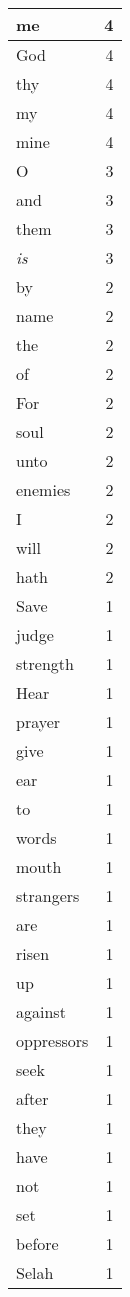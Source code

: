 \begin{center}
\begin{longtable}{l|r}
\hline \hline
\endlastfoot
me & 4 \\ \hline
God & 4 \\ \hline
thy & 4 \\ \hline
my & 4 \\ \hline
mine & 4 \\ \hline
O & 3 \\ \hline
and & 3 \\ \hline
them & 3 \\ \hline
\emph{is} & 3 \\ \hline
by & 2 \\ \hline
name & 2 \\ \hline
the & 2 \\ \hline
of & 2 \\ \hline
For & 2 \\ \hline
soul & 2 \\ \hline
unto & 2 \\ \hline
enemies & 2 \\ \hline
I & 2 \\ \hline
will & 2 \\ \hline
hath & 2 \\ \hline
Save & 1 \\ \hline
judge & 1 \\ \hline
strength & 1 \\ \hline
Hear & 1 \\ \hline
prayer & 1 \\ \hline
give & 1 \\ \hline
ear & 1 \\ \hline
to & 1 \\ \hline
words & 1 \\ \hline
mouth & 1 \\ \hline
strangers & 1 \\ \hline
are & 1 \\ \hline
risen & 1 \\ \hline
up & 1 \\ \hline
against & 1 \\ \hline
oppressors & 1 \\ \hline
seek & 1 \\ \hline
after & 1 \\ \hline
they & 1 \\ \hline
have & 1 \\ \hline
not & 1 \\ \hline
set & 1 \\ \hline
before & 1 \\ \hline
Selah & 1 \\ \hline

\end{longtable}
\end{center}
